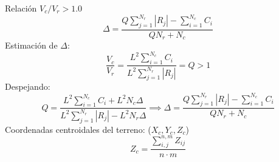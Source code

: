 Relación $V_c/V_r > 1.0$
\begin{equation}
  \Delta = \frac{Q\sum_{j = 1}^{N_r}\left\lvert R_j\right\rvert - \sum_{i = 1}^{N_c}C_i}{QN_r + N_c}
\end{equation}
Estimación de $\Delta$:
\begin{equation}
  \frac{V_c}{V_r} = \frac{L^2 \sum_{i = 1}^{N_c}C_i}{L^2 \sum_{j = 1}^{N_r}\left\lvert R_j\right\rvert} = Q > 1
\end{equation}
Despejando:
\begin{equation*}
  Q =\frac{L^2 \sum_{i = 1}^{N_c}C_i +L^2 N_c\Delta }{L^2 \sum_{j = 1}^{N_r}\left\lvert R_j\right\rvert - L^2 N_r\Delta}  \implies \Delta =\frac{Q\sum_{j = 1}^{N_r}\left\lvert R_j\right\rvert -\sum_{i = 1}^{N_c}C_i }{QN_r + N_c}
\end{equation*}
Coordenadas centroidales del terreno: ($X_c, Y_c, Z_c$)
\begin{equation}
  Z_c = \frac{\sum_{i,j}^{n,m} Z_{ij}}{n \cdot m}
\end{equation}
